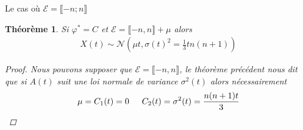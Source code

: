 \documentclass{article}
\newtheorem{theorem}{Théorème}[section]
\begin{document}
\begin{section}{Le cas où $\mathcal{E} = \llbracket -n; n\rrbracket$}
%
%
%
%
%
%
%
\begin{theorem}
	Si $\varphi^*=C$ et $\mathcal{E}=\llbracket -n,n\rrbracket+\mu$ alors
	\begin{align*}
		X(t) \sim \mathcal{N}(\mu t, \sigma(t)^2 = \frac{1}{3}tn(n+1))
	\end{align*}
	\begin{proof}
		Nous pouvons supposer que $\mathcal{E}=\llbracket -n,n\rrbracket$, le théorème précédent nous dit que si $A(t)$ suit une loi normale de variance $\sigma^2(t)$ alors nécessairement 
	\begin{align*}
		\mu = C_1(t) = 0 \indent C_2(t) = \sigma^2(t)  = \frac{n(n+1)t}{3}
	\end{align*}


\end{proof}
\end{theorem}
\end{section}
\end{document}
